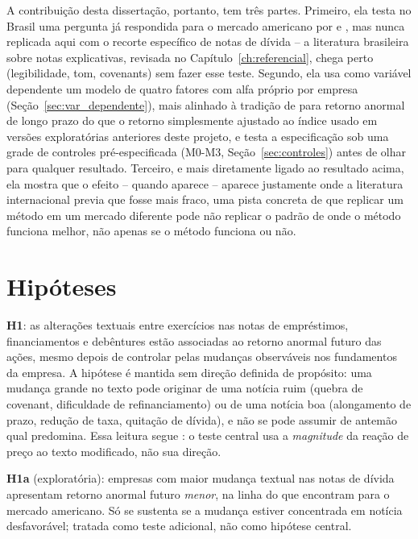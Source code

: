 \documentclass[a4paper,12pt]{report}
\begin{document}
A contribuição desta dissertação, portanto, tem três partes. Primeiro, ela testa no Brasil uma pergunta já respondida para o mercado americano por  e , mas nunca replicada aqui com o recorte específico de notas de dívida -- a literatura brasileira sobre notas explicativas, revisada no Capítulo~\ref{ch:referencial}, chega perto (legibilidade, tom, covenants) sem fazer esse teste. Segundo, ela usa como variável dependente um modelo de quatro fatores com alfa próprio por empresa (Seção~\ref{sec:var_dependente}), mais alinhado à tradição de  para retorno anormal de longo prazo do que o retorno simplesmente ajustado ao índice usado em versões exploratórias anteriores deste projeto, e testa a especificação sob uma grade de controles pré-especificada (M0-M3, Seção~\ref{sec:controles}) antes de olhar para qualquer resultado. Terceiro, e mais diretamente ligado ao resultado acima, ela mostra que o efeito -- quando aparece -- aparece justamente onde a literatura internacional previa que fosse mais fraco, uma pista concreta de que replicar um método em um mercado diferente pode não replicar o padrão de onde o método funciona melhor, não apenas se o método funciona ou não.

\section{Hipóteses}
\label{sec:hipoteses}

\textbf{H1}: as alterações textuais entre exercícios nas notas de empréstimos, financiamentos e debêntures estão associadas ao retorno anormal futuro das ações, mesmo depois de controlar pelas mudanças observáveis nos fundamentos da empresa. A hipótese é mantida sem direção definida de propósito: uma mudança grande no texto pode originar de uma notícia ruim (quebra de covenant, dificuldade de refinanciamento) ou de uma notícia boa (alongamento de prazo, redução de taxa, quitação de dívida), e não se pode assumir de antemão qual predomina. Essa leitura segue : o teste central usa a \emph{magnitude} da reação de preço ao texto modificado, não sua direção.

\textbf{H1a} (exploratória): empresas com maior mudança textual nas notas de dívida apresentam retorno anormal futuro \emph{menor}, na linha do que  encontram para o mercado americano. Só se sustenta se a mudança estiver concentrada em notícia desfavorável; tratada como teste adicional, não como hipótese central.
\end{document}
